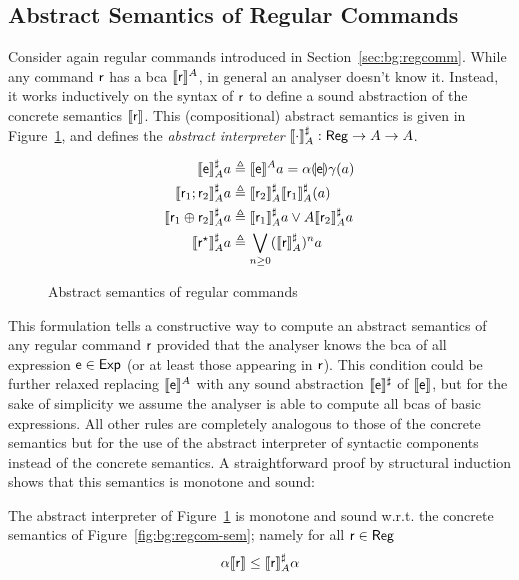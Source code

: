 \subsection{Abstract Semantics of Regular Commands}
Consider again regular commands introduced in Section~\ref{sec:bg:regcomm}. While any command $\mathsf{r}$ has a bca $\llbracket\mathsf{r}\rrbracket^{A}$, in general an analyser doesn't know it. Instead, it works inductively on the syntax of $\mathsf{r}$ to define a sound abstraction of the concrete semantics $\llbracket\mathsf{r}\rrbracket$. This (compositional) abstract semantics is given in Figure~\ref{fig:bg:regcom-abs-sem}, and defines the \emph{abstract interpreter} $\llbracket\cdot\rrbracket^{\sharp}_{A} : \mathsf{Reg} \rightarrow A \rightarrow A$.
\begin{figure}[t]
	\begin{align*}
		\begin{split}
			\llbracket\mathsf{e}\rrbracket^{\sharp}_{A} a &\triangleq \llbracket\mathsf{e}\rrbracket^{A} a = \alpha \llparenthesis\mathsf{e}\rrparenthesis \gamma (a)\\ 
			\llbracket\mathsf{r}_1 ; \mathsf{r}_2\rrbracket^{\sharp}_{A} a &\triangleq \llbracket\mathsf{r}_2\rrbracket^{\sharp}_{A} \llbracket\mathsf{r}_1\rrbracket^{\sharp}_{A} (a) \\
			\llbracket\mathsf{r}_1 \oplus \mathsf{r}_2\rrbracket^{\sharp}_{A} a &\triangleq \llbracket\mathsf{r}_1\rrbracket^{\sharp}_{A} a \vee A \llbracket\mathsf{r}_2\rrbracket^{\sharp}_{A} a \\
			\llbracket\mathsf{r}^\star\rrbracket^{\sharp}_{A} a &\triangleq \bigvee_{n \ge 0}  (\llbracket\mathsf{r}\rrbracket^{\sharp}_{A})^n a
		\end{split}
	\end{align*}
	\caption{Abstract semantics of regular commands}
	\label{fig:bg:regcom-abs-sem}
\end{figure}
This formulation tells a constructive way to compute an abstract semantics of any regular command $\mathsf{r}$ provided that the analyser knows the bca of all expression $\mathsf{e} \in \mathsf{Exp}$ (or at least those appearing in $\mathsf{r}$). This condition could be further relaxed replacing $\llbracket\mathsf{e}\rrbracket^{A}$ with any sound abstraction $\llbracket\mathsf{e}\rrbracket^{\sharp}$ of $\llbracket\mathsf{e}\rrbracket$, but for the sake of simplicity we assume the analyser is able to compute all bcas of basic expressions. All other rules are completely analogous to those of the concrete semantics but for the use of the abstract interpreter of syntactic components instead of the concrete semantics.
A straightforward proof by structural induction shows that this semantics is monotone and sound:
\begin{prop}
	The abstract interpreter of Figure~\ref{fig:bg:regcom-abs-sem} is monotone and sound w.r.t. the concrete semantics of Figure~\ref{fig:bg:regcom-sem}; namely for all $\mathsf{r} \in \mathsf{Reg}$
	\[
	\alpha \llbracket\mathsf{r}\rrbracket \le \llbracket\mathsf{r}\rrbracket^{\sharp}_A \alpha
	\]
\end{prop}
